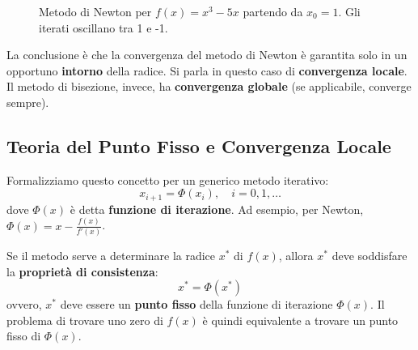 \begin{figure}[H] %
\centering
{}
\caption{Metodo di Newton per $f(x)=x^3-5x$ partendo da $x_0=1$. Gli iterati oscillano tra 1 e -1.}
\label{fig:newton_oscillante}
\end{figure}

La conclusione è che la convergenza del metodo di Newton è garantita solo in un opportuno \textbf{intorno} della radice. Si parla in questo caso di \textbf{convergenza locale}. Il metodo di bisezione, invece, ha \textbf{convergenza globale} (se applicabile, converge sempre).

\subsection{Teoria del Punto Fisso e Convergenza Locale}
Formalizziamo questo concetto per un generico metodo iterativo:
\begin{equation}
    x_{i+1} = \Phi(x_i), \quad i=0, 1, \dots
\end{equation}
dove $\Phi(x)$ è detta \textbf{funzione di iterazione}. Ad esempio, per Newton, $\Phi(x) = x - \frac{f(x)}{f'(x)}$.

Se il metodo serve a determinare la radice $x^*$ di $f(x)$, allora $x^*$ deve soddisfare la \textbf{proprietà di consistenza}:
\begin{equation}
    x^* = \Phi(x^*)
\end{equation}
ovvero, $x^*$ deve essere un \textbf{punto fisso} della funzione di iterazione $\Phi(x)$. Il problema di trovare uno zero di $f(x)$ è quindi equivalente a trovare un punto fisso di $\Phi(x)$.

